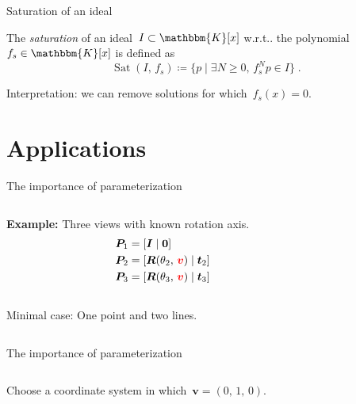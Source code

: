 \documentclass[aspectratio=169]{beamer}
\makeatletter
\newcommand{\K}{\ensuremath{\mathbbm{K}}}
\newcommand{\mat}[1]{\bm{#1}}
\DeclareRobustCommand\wrt{w.r.t\@ifnextchar.{}{.\@}}
\DeclareMathOperator{\sat}{Sat}
\makeatother
\begin{document}
\begin{frame}{Saturation of an ideal}
\begin{definition}
The \emph{saturation} of an ideal~$I\subset\K[x]$ \wrt{} the polynomial $f_s\in\K[x]$ is
defined as
\begin{equation*}
    \sat(I,\, f_s) \coloneqq \{p\;|\;\exists N\geq 0,\, f_s^N p\in I  \}\;.
\end{equation*}
\end{definition}
\alert{Interpretation:} we can remove solutions for which~$f_s(x) =0$.
\end{frame}

\section{Applications}
\begin{frame}{The importance of parameterization}
\begin{columns}
    \begin{column}{0.5\textwidth}
        \textbf{Example:} Three views with known rotation axis.\\[8mm]
        \begin{equation*}
            \begin{aligned}
                \mat{P}_1 &= [\mat{I}\;|\;\mat{0}] \\
                \mat{P}_2 &= [\mat{R}(\theta_2,\,{\color{red}\mat{v}})\;|\;\mat{t}_2] \\
                \mat{P}_3 &= [\mat{R}(\theta_3,\,{\color{red}\mat{v}})\;|\;\mat{t}_3]
            \end{aligned}
        \end{equation*}\\[8mm]
        Minimal case: One point and two lines.
    \end{column}%
    \begin{column}{0.5\textwidth}
        \centering
        
    \end{column}
\end{columns}
\end{frame}

\begin{frame}{The importance of parameterization}
\begin{columns}
    \begin{column}{0.5\textwidth}
        Choose a coordinate system in which~$\mat{v}=(0,\,1,\,0)$.
    \end{column}%
    \begin{column}{0.5\textwidth}
        \centering
        
    \end{column}
\end{columns}

\end{frame}
\end{document}
